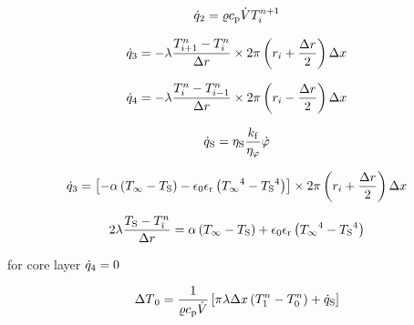 \documentclass{scrartcl}
\begin{document}
    \begin{equation}
        {\dot{q}}_2 = {\varrho} {c_\mathrm{p}} {\dot{V}} {T}_{{i}}^{{n}+1}
        \label{eq:heat_flow_2}
    \end{equation}

    \begin{equation}
        {\dot{q}}_3 = -{\lambda} \frac{{T}_{{i}+1}^{{n}}-{T}_{{i}}^{{n}}}{{\Delta r}} \times 2 \pi \left( {r}_{i} + \frac{{\Delta r}}{2} \right) {\Delta x}
        \label{eq:heat_flow_3}
    \end{equation}

    \begin{equation}
        {\dot{q}}_4 = -{\lambda} \frac{{T}_{{i}}^{{n}}-{T}_{{i}-1}^{{n}}}{{\Delta r}} \times 2 \pi \left( {r}_{i} - \frac{{\Delta r}}{2} \right) {\Delta x}
        \label{eq:heat_flow_4}
    \end{equation}

    \begin{equation}
        {\dot{q}_\mathrm{S}} = {\eta_\mathrm{S}} \frac{{k_\mathrm{f}}}{{\eta_\varphi}} {\dot{\varphi}}
        \label{eq:heat_source}
    \end{equation}

    \begin{equation}
        {\dot{q}}_3 = \left[ -{\alpha} \left( {T_\infty} - {T_\mathrm{S}} \right) - {\epsilon_0}{\epsilon_\mathrm{r}}\left( {T_\infty}^4 - {T_\mathrm{S}}^4 \right) \right]
        \times 2 \pi \left( {r}_{i} + \frac{{\Delta r}}{2} \right) {\Delta x}
        \label{eq:heat_flow_3_surface}
    \end{equation}

    \begin{equation}
        2 {\lambda} \frac{{T_\mathrm{S}} - {T}_{\hat{\imath}}^{n}}{{\Delta r}} = {\alpha} \left( {T_\infty} - {T_\mathrm{S}} \right) + {\epsilon_0}{\epsilon_\mathrm{r}}\left( {T_\infty}^4 - {T_\mathrm{S}}^4 \right)
        \label{eq:surface_temperature}
    \end{equation}

    for core layer ${\dot{q}}_4 = 0$

    \begin{equation}
        {\Delta T}_0 = \frac{1}{{\varrho}{c_\mathrm{p}}{\dot{V}}} \left[ \pi {\lambda} {\Delta x} \left( {T}_1^{n} - {T}_0^{n} \right) + {\dot{q}_\mathrm{S}} \right]
        \label{eq:increment_core}
    \end{equation}
\end{document}
